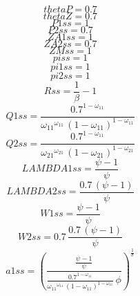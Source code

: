 \begin{dmath*}
thetaP = 0.7
\end{dmath*}
\begin{dmath*}
thetaZ = 0.7
\end{dmath*}
\begin{dmath*}
P1ss = 1
\end{dmath*}
\begin{dmath*}
P2ss = 0.7
\end{dmath*}
\begin{dmath*}
ZA1ss = 1
\end{dmath*}
\begin{dmath*}
ZA2ss = 0.7
\end{dmath*}
\begin{dmath*}
ZMss = 1
\end{dmath*}
\begin{dmath*}
piss = 1
\end{dmath*}
\begin{dmath*}
pi1ss = 1
\end{dmath*}
\begin{dmath*}
pi2ss = 1
\end{dmath*}
\begin{dmath*}
Rss = \frac{1}{{{\beta}}}-1
\end{dmath*}
\begin{dmath*}
Q1ss = \frac{0.7^{1-{{\omega_{11}}}}}{{{\omega_{11}}}^{{{\omega_{11}}}}\, \left(1-{{\omega_{11}}}\right)^{1-{{\omega_{11}}}}}
\end{dmath*}
\begin{dmath*}
Q2ss = \frac{0.7^{1-{{\omega_{11}}}}}{{{\omega_{21}}}^{{{\omega_{21}}}}\, \left(1-{{\omega_{21}}}\right)^{1-{{\omega_{21}}}}}
\end{dmath*}
\begin{dmath*}
LAMBDA1ss = \frac{{{\psi}}-1}{{{\psi}}}
\end{dmath*}
\begin{dmath*}
LAMBDA2ss = \frac{0.7\, \left({{\psi}}-1\right)}{{{\psi}}}
\end{dmath*}
\begin{dmath*}
W1ss = \frac{{{\psi}}-1}{{{\psi}}}
\end{dmath*}
\begin{dmath*}
W2ss = 0.7\, \frac{0.7\, \left({{\psi}}-1\right)}{{{\psi}}}
\end{dmath*}
\begin{dmath*}
a1ss = \left(\frac{\frac{{{\psi}}-1}{{{\psi}}}}{\frac{0.7^{1-{{\omega_{11}}}}}{{{\omega_{11}}}^{{{\omega_{11}}}}\, \left(1-{{\omega_{11}}}\right)^{1-{{\omega_{11}}}}}\, {{\phi}}}\right)^{\frac{1}{{{\sigma}}}}
\end{dmath*}

